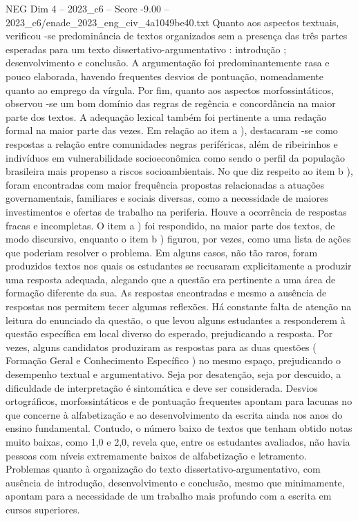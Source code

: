 \begin{textsample}{NEG Dim 4 – 2023\_c6 – Score -9.00 – 2023\_c6/enade\_2023\_eng\_civ\_4a1049be40.txt}
Quanto aos aspectos textuais, verificou -se predominância de textos organizados sem a presença das três partes esperadas para um texto dissertativo-argumentativo : introdução ; desenvolvimento e conclusão.
A argumentação foi predominantemente rasa e pouco elaborada, havendo frequentes desvios de pontuação, nomeadamente quanto ao emprego da vírgula.
Por fim, quanto aos aspectos morfossintáticos, observou -se um bom domínio das regras de regência e concordância na maior parte dos textos.
A adequação lexical também foi pertinente a uma redação formal na maior parte das vezes.
Em relação ao item a ), destacaram -se como respostas a relação entre comunidades negras periféricas, além de ribeirinhos e indivíduos em vulnerabilidade socioeconômica como sendo o perfil da população brasileira mais propenso a riscos socioambientais.
No que diz respeito ao item b ), foram encontradas com maior frequência propostas relacionadas a atuações governamentais, familiares e sociais diversas, como a necessidade de maiores investimentos e ofertas de trabalho na periferia.
Houve a ocorrência de respostas fracas e incompletas.
O item a ) foi respondido, na maior parte dos textos, de modo discursivo, enquanto o item b ) figurou, por vezes, como uma lista de ações que poderiam resolver o problema.
Em alguns casos, não tão raros, foram produzidos textos nos quais os estudantes se recusaram explicitamente a produzir uma resposta adequada, alegando que a questão era pertinente a uma área de formação diferente da sua.
As respostas encontradas e mesmo a ausência de respostas nos permitem tecer algumas reflexões.
Há constante falta de atenção na leitura do enunciado da questão, o que levou alguns estudantes a responderem à questão específica em local diverso do esperado, prejudicando a resposta.
Por vezes, alguns candidatos produziram as respostas para as duas questões ( Formação Geral e Conhecimento Específico ) no mesmo espaço, prejudicando o desempenho textual e argumentativo.
Seja por desatenção, seja por descuido, a dificuldade de interpretação é sintomática e deve ser considerada.
Desvios ortográficos, morfossintáticos e de pontuação frequentes apontam para lacunas no que concerne à alfabetização e ao desenvolvimento da escrita ainda nos anos do ensino fundamental.
Contudo, o número baixo de textos que tenham obtido notas muito baixas, como 1,0 e 2,0, revela que, entre os estudantes avaliados, não havia pessoas com níveis extremamente baixos de alfabetização e letramento.
Problemas quanto à organização do texto dissertativo-argumentativo, com ausência de introdução, desenvolvimento e conclusão, mesmo que minimamente, apontam para a necessidade de um trabalho mais profundo com a escrita em cursos superiores.

\end{textsample}
